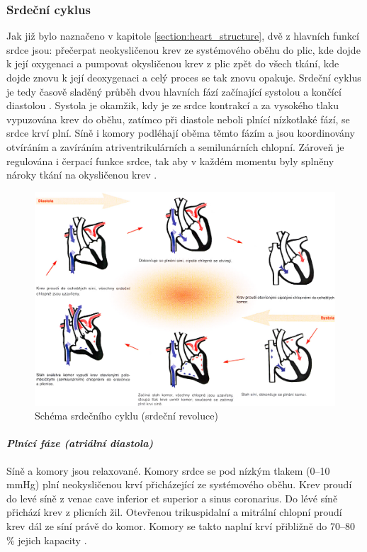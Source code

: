 \subsubsection{Srdeční cyklus}
\label{section:cardiac_cycle}
Jak již bylo naznačeno v kapitole \ref{section:heart_structure}, dvě z hlavních
funkcí srdce jsou: přečerpat neokysličenou krev ze systémového oběhu do plic,
kde dojde k její oxygenaci a pumpovat okysličenou krev z plic zpět do všech
tkání, kde dojde znovu k její deoxygenaci a celý proces se tak znovu opakuje.
Srdeční cyklus je tedy časově sladěný průběh dvou hlavních fází začínající
systolou a končící diastolou \cite{Weinhaus2005}. Systola je okamžik, kdy je ze
srdce kontrakcí a za vysokého tlaku vypuzována krev do oběhu, zatímco při
diastole neboli plnící nízkotlaké fází, se srdce krví plní. Síně i komory
podléhají oběma těmto fázím a jsou koordinovány otvíráním a zavíráním
atriventrikulárních a semilunárních chlopní. Zároveň je regulována i čerpací
funkce srdce, tak aby v každém momentu byly splněny nároky tkání na okysličenou
krev \cite{OpenStax}.

\begin{figure}[h]
	\begin{center}
		\includegraphics[width=1\textwidth]{../assets/anatomy/cardiac_cycle}
		\caption{Schéma srdečního cyklu (srdeční revoluce) \cite{Trojan2002}}
		\label{fig:cardiac_cycle}
	\end{center}
\end{figure}

\paragraph*{\textit{Plnící fáze (atriální diastola)}\\} Síně a komory jsou
relaxované. Komory srdce se pod nízkým tlakem (0--10 \si{\mmHg}) plní neokysličenou
krví přicházející ze systémového oběhu. Krev proudí do levé síně z venae cave
inferior et superior a sinus coronarius. Do lévé síně přichází krev z plicních
žil. Otevřenou trikuspidalní a mitrální chlopní proudí krev dál ze síní právě do
komor. Komory se takto naplní krví přibližně do 70--80 \% jejich kapacity
\cite{OpenStax}.

